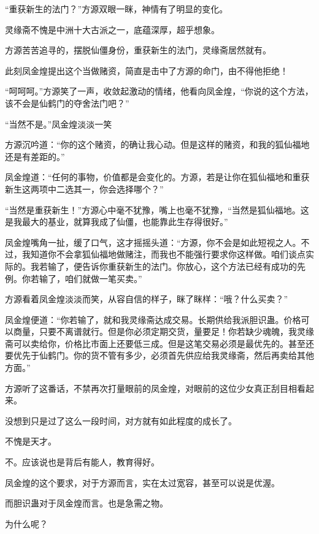 
\begin{this_body}

“重获新生的法门？”方源双眼一眯，神情有了明显的变化。

灵缘斋不愧是中洲十大古派之一，底蕴深厚，超乎想象。

方源苦苦追寻的，摆脱仙僵身份，重获新生的法门，灵缘斋居然就有。

此刻凤金煌提出这个当做赌资，简直是击中了方源的命门，由不得他拒绝！

“呵呵呵。”方源笑了一声，收敛起激动的情绪，他看向凤金煌，“你说的这个方法，该不会是仙鹤门的夺舍法门吧？”

“当然不是。”凤金煌淡淡一笑

方源沉吟道：“你的这个赌资，的确让我心动。但是这样的赌资，和我的狐仙福地还是有差距的。”

凤金煌道：“任何的事物，价值都是会变化的。方源，若是让你在狐仙福地和重获新生这两项中二选其一，你会选择哪个？”

“当然是重获新生！”方源心中毫不犹豫，嘴上也毫不犹豫，“当然是狐仙福地。这是我最大的基业，就算我成了仙僵，也能靠此生存得很好。”

凤金煌嘴角一扯，缓了口气，这才摇摇头道：“方源，你不会是如此短视之人。不过，我知道你不会拿狐仙福地做赌注，而我也不能强行要求你这样做。咱们谈点实际的。我若输了，便告诉你重获新生的法门。你放心，这个方法已经有成功的先例。你若输了，咱们就做一笔买卖。”

方源看着凤金煌淡淡而笑，从容自信的样子，眯了眯样：“哦？什么买卖？”

凤金煌便道：“你若输了，就和我灵缘斋达成交易。长期供给我派胆识蛊。价格可以商量，只要不离谱就行。但是你必须定期交货，量要足！你若缺少魂魄，我灵缘斋可以卖给你，价格比市面上还要低三成。但是这笔交易必须是最优先的。甚至还要优先于仙鹤门。你的货不管有多少，必须首先供应给我灵缘斋，然后再卖给其他方面。”

方源听了这番话，不禁再次打量眼前的凤金煌，对眼前的这位少女真正刮目相看起来。

没想到只是过了这么一段时间，对方就有如此程度的成长了。

不愧是天才。

不。应该说也是背后有能人，教育得好。

凤金煌的这个要求，对于方源而言，实在太过宽容，甚至可以说是优渥。

而胆识蛊对于凤金煌而言。也是急需之物。

为什么呢？


\end{this_body}
